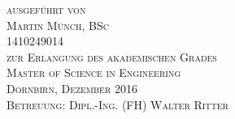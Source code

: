 \begin{titlepage}
\begin{center}

\textsc{ausgeführt von}\\ [0.4cm]
\textsc{\Large Martin Münch, BSc}\\
1410249014 \\[2cm]

\textsc{zur Erlangung des akademischen Grades\\Master of Science in Engineering}\\[1cm]
\textsc{Dornbirn, Dezember 2016}\\[1.5cm]
\textsc{Betreuung: Dipl.-Ing. (FH) Walter Ritter}

\hfill\\ [0.2cm]


\vspace*{\fill}

\hfill




\vfill %

\end{center}

\end{titlepage}

